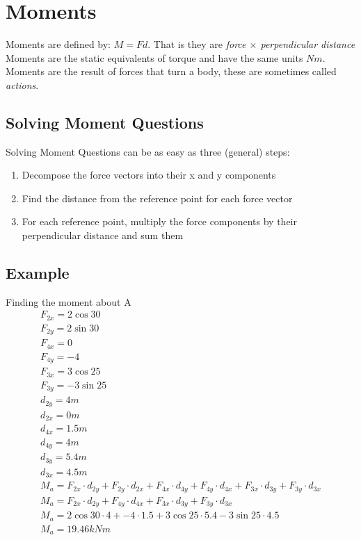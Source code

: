 \documentclass[a4paper, 12pt]{article}
\begin{document}
\newpage
\section{Moments}
Moments are defined by: $M=Fd$.
That is they are \textit{force $\times$ perpendicular distance}
Moments are the static equivalents of torque and have the same units $Nm$.
Moments are the result of forces that turn a body, these are sometimes called \textit{actions}.
\subsection{Solving Moment Questions}
Solving Moment Questions can be as easy as three (general) steps:
\begin{enumerate}
    \item Decompose the force vectors into their x and y components 
    \item Find the distance from the reference point for each force vector
    \item For each reference point, multiply the force components by their perpendicular distance and sum them 
\end{enumerate}
\subsection{Example}
\begin{example}
Finding the moment about A
\begin{gather*}
    F_{2x} = 2\cos{30} \\ 
    F_{2y} = 2\sin{30} \\
    F_{4x} = 0 \\ 
    F_{4y} = -4 \\
    F_{3x} = 3\cos{25} \\
    F_{3y} = -3\sin{25} \\
    d_{2y} = 4m \\
    d_{2x} = 0m \\
    d_{4x} = 1.5m \\
    d_{4y} = 4m \\
    d_{3y} = 5.4m \\
    d_{3x} = 4.5m \\
    M_a = F_{2x} \cdot d_{2y} + F_{2y} \cdot d_{2x} + F_{4x} \cdot d_{4y} + F_{4y} \cdot d_{4x} + F_{3x} \cdot d_{3y} + F_{3y} \cdot d_{3x} \\
    M_a = F_{2x} \cdot d_{2y} + F_{4y} \cdot d_{4x} + F_{3x} \cdot d_{3y} + F_{3y} \cdot d_{3x} \\
    M_a = 2\cos{30} \cdot 4 + -4 \cdot 1.5 + 3\cos{25} \cdot 5.4 - 3\sin{25} \cdot 4.5 \\ 
    M_a = 19.46 \unit{kNm}
\end{gather*}
\end{example}
\end{document}
